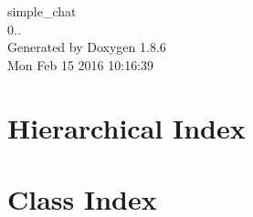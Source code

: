 \documentclass[twoside]{book}
\newcommand{\clearemptydoublepage}{%
  \newpage{\pagestyle{empty}\cleardoublepage}%
}
\begin{document}
\hypersetup{pageanchor=false}
\begin{titlepage}
\vspace*{7cm}
\begin{center}%
{\Large simple\-\_\-chat \\[1ex]\large 0.. }\\
\vspace*{1cm}
{\large Generated by Doxygen 1.8.6}\\
\vspace*{0.5cm}
{\small Mon Feb 15 2016 10:16:39}\\
\end{center}
\end{titlepage}
\clearemptydoublepage
\tableofcontents
\clearemptydoublepage
{}
\hypersetup{pageanchor=true}

\chapter{Hierarchical Index}

\chapter{Class Index}

\end{document}
